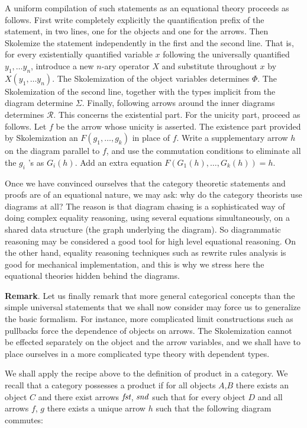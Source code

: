 A uniform compilation of such statements as an equational theory proceeds as follows.
First write completely explicitly the quantification prefix of the statement, in two
lines, one for the objects and one for the arrows. Then Skolemize the statement
independently in the first and the second line. That is, for every existentially
quantified variable $x$ following the universally quantified $y_1, \ldots y_n$, introduce
a new $n$-ary operator $X$ and substitute throughout $x$ by $X\left(y_1, \ldots
y_n\right)$. The Skolemization of the object variables determines $\Phi$. The
Skolemization of the second line, together with the types implicit from the diagram
determine $\Sigma$. Finally, following arrows around the inner diagrams determines
$\mathcal{R}$. This concerns the existential part. For the unicity part, proceed as
follows. Let $f$ be the arrow whose unicity is asserted. The existence part provided by
Skolemization an $F\left(g_1, \ldots, g_k\right)$ in place of $f$. Write a supplementary
arrow $h$ on the diagram parallel to $f$, and use the commutation conditions to eliminate
all the $g_i$ 's as $G_i(h)$. Add an extra equation $F\left(G_1(h), \ldots,
G_k(h)\right)=h$.

Once we have convinced ourselves that the category theoretic statements and proofs are of
an equational nature, we may ask: why do the category theorists use diagrams at all? The
reason is that diagram chasing is a sophisticated way of doing complex equality reasoning,
using several equations simultaneously, on a shared data structure (the graph underlying
the diagram). So diagrammatic reasoning may be considered a good tool for high level
equational reasoning. On the other hand, equality reasoning techniques such as rewrite
rules analysis is good for mechanical implementation, and this is why we stress here the
equational theories hidden behind the diagrams. 

\bigskip\noindent
{\bf Remark}. Let us finally remark that more
general categorical concepts than the simple universal statements that we shall now
consider may force us to generalize the basic formalism. For instance, more complicated
limit constructions such as pullbacks force the dependence of objects on arrows. The
Skolemization cannot be eﬀected separately on the object and the arrow variables, and we
shall have to place ourselves in a more complicated type theory with dependent types.

We shall apply the recipe above to the definition of product in a category. We recall that a category
possesses a product if for all objects $A$,$B$ there exists an object $C$ and there exist arrows
$\mathop{\text{\it fst}}$, $\mathop{\text{\it snd}}$ such that for every object $D$ and all arrows $f$, $g$ 
there exists a unique arrow $h$ such that the
following diagram commutes:

